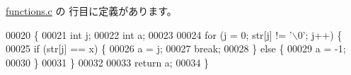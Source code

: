  \hyperlink{functions_8c_source}{functions.\-c} の  行目に定義があります。


\begin{DoxyCode}
00020                                     \{
00021   \textcolor{keywordtype}{int} j;
00022   \textcolor{keywordtype}{int} a;
00023 
00024   \textcolor{keywordflow}{for} (j = 0; str[j] != \textcolor{charliteral}{'\(\backslash\)0'}; j++) \{
00025     \textcolor{keywordflow}{if} (str[j] == x) \{
00026       a = j;
00027       \textcolor{keywordflow}{break};
00028     \} \textcolor{keywordflow}{else} \{
00029       a = -1;
00030     \}
00031   \}
00032 
00033   \textcolor{keywordflow}{return} a;
00034 \}
\end{DoxyCode}
